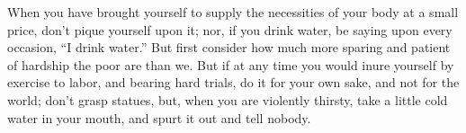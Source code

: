 When you have brought yourself to supply the necessities of your
body at a small price, don't pique yourself upon it; nor, if you drink
water, be saying upon every occasion, ``I drink water.'' But first consider
how much more sparing and patient of hardship the poor are than we.
But if at any time you would inure yourself by exercise to labor,
and bearing hard trials, do it for your own sake, and not for the
world; don't grasp statues, but, when you are violently thirsty, take
a little cold water in your mouth, and spurt it out and tell nobody.
